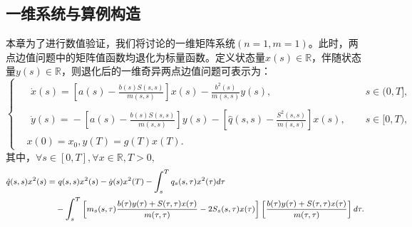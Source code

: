 \documentclass{GZUbachelorthesis}
\begin{document}
\subsection{一维系统与算例构造}
本章为了进行数值验证，我们将讨论的一维矩阵系统$(n=1,m=1)$。此时，两点边值问题中的矩阵值函数均退化为标量函数。定义状态量$x(s)\in\mathbb{R}$，伴随状态量$y(s)\in\mathbb{R}$，则退化后的一维奇异两点边值问题可表示为：
\begin{equation}\label{4.1}
	\left\{
	\begin{aligned}
		&\begin{aligned}
			\dot{x}(s) ={}  \left[a(s)-\frac{b(s)S(s,s)}{m(s,s)}\right]x(s) -\frac{b^2(s)}{m(s,s)}y(s),
		\end{aligned}
		&& s\in(0,T], \\[8pt]
		&\begin{aligned}
			\dot{y}(s) ={}  -\left[a(s)-\frac{b(s)S(s,s)}{m(s,s)}\right]y(s) -\left[\hat{q}(s,s)-\frac{S^2(s,s)}{m(s,s)}\right]x(s),
		\end{aligned}
		&& s\in[0,T), \\[8pt]
		&x(0) = x_0, y(T) = g(T)x(T).
	\end{aligned}
	\right.
\end{equation}
其中，${\forall s\in[0,T],\forall x\in\mathbb{R},T>0,}$
\begin{equation}\label{4.2}
	{\footnotesize
		\begin{aligned}
			\hat{q}(s,s) x^2(s) =& \ q(s,s) x^2(s) - \dot{g}(s) x^2(T) - \int_{s}^{T} q_s(s,\tau) x^2(\tau) d\tau \\
			&- \int_{s}^{T} \left[ m_s(s,\tau) \frac{b(\tau)y(\tau)+S(\tau,\tau)x(\tau)}{m(\tau,\tau)} - 2S_s(s,\tau)x(\tau) \right]\left[ \frac{b(\tau)y(\tau)+S(\tau,\tau)x(\tau)}{m(\tau,\tau)} \right] d\tau.
	\end{aligned}}
\end{equation}
\end{document}
